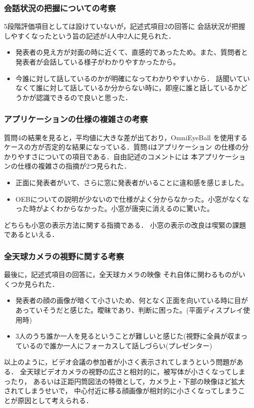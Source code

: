 \subsubsection*{会話状況の把握についての考察}
5段階評価項目としては設けていないが，記述式項目2の回答に
会話状況が把握しやすくなったという旨の記述が4人中2人に見られた．
\begin{itemize}
  \item 発表者の見え方が対面の時に近くて、直感的であったため。また、質問者と発表者が会話している様子がわかりやすかったから。
  \item 今誰に対して話しているのかが明確になってわかりやすいから． 話聞いていなくて誰に対して話しているか分からない時に，即座に誰と話しているかどうかが認識できるので良いと思った．
\end{itemize}

\subsubsection*{アプリケーションの仕様の複雑さの考察}
質問4の結果を見ると，平均値に大きな差が出ており，OmniEyeBall
を使用するケースの方が否定的な結果になっている．質問4はアプリケーション
の仕様の分かりやすさについての項目である．自由記述のコメントには
本アプリケーションの仕様の複雑さの指摘が2つ見られた．
\begin{itemize}
  \item 正面に発表者がいて、さらに窓に発表者がいることに違和感を感じました。
  \item OEBについての説明が少ないので仕様がよく分からなかった。小窓がなくなった時がよくわからなかった。小窓が唐突に消えるのに驚いた。
\end{itemize}
どちらも小窓の表示方法に関する指摘である．
小窓の表示の改良は喫緊の課題であるといえる．

\subsubsection*{全天球カメラの視野に関する考察}
最後に，記述式項目の回答に，全天球カメラの映像
それ自体に関わるものがいくつか見られた．
\begin{itemize}
  \item 発表者の顔の画像が暗くて小さいため、何となく正面を向いている時に目があっていそうだと感じた。曖昧であり、判断に困った。(平面ディスプレイ使用時)
  \item 3人のうち誰か一人を見るということが難しいと感じた(視野に全員が収まっているので誰か一人にフォーカスして話しづらい(プレゼンター)
\end{itemize}
以上のように，ビデオ会議の参加者が小さく表示されてしまうという問題がある．
全天球ビデオカメラの視野の広さと相対的に，被写体が小さくなってしまったり，
あるいは正距円筒図法の特徴として，カメラ上・下部の映像ほど拡大されてしまうせいで，
中心付近に移る顔画像が相対的に小さくなってしまうことが原因として考えられる．

